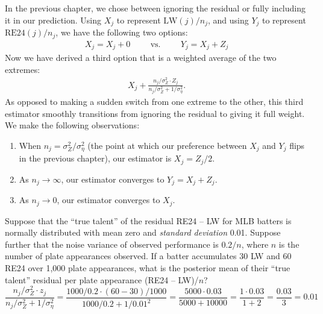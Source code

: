\documentclass{article}
\begin{document}
      In the previous chapter, we chose between ignoring the residual or fully including it in our prediction. Using $X_j$ to represent $\mbox{LW}(j) / n_j$, and using $Y_j$ to represent $\mbox{RE24}(j) / n_j$, we have the following two options:
      \begin{align*}
        X_j = X_j + 0 \hspace{1cm} \mbox{vs.} \hspace{1cm} Y_j = X_j + Z_j
      \end{align*}
      Now we have derived a third option that is a weighted average of the two extremes:
      \begin{align*}
        X_j + \frac{n_j / \sigma^2_Z \cdot Z_j}{n_j / \sigma^2_Z + 1 / \sigma^2_\eta}.
      \end{align*}
      As opposed to making a sudden switch from one extreme to the other, this third estimator smoothly transitions from ignoring the residual to giving it full weight. We make the following observations:
      \begin{enumerate}
        \item When $n_j = \sigma^2_Z / \sigma^2_\eta$ (the point at which our preference between $X_j$ and $Y_j$ flips in the previous chapter), our estimator is $X_j = Z_j / 2$.
        \item As $n_j \rightarrow \infty$, our estimator converges to $Y_j = X_j + Z_j$.
        \item As $n_j \rightarrow 0$, our estimator converges to $X_j$.
      \end{enumerate}

      \begin{framed}
         Suppose that the ``true talent'' of the residual RE24 -- LW for MLB batters is normally distributed with mean zero and {\it standard deviation} 0.01. Suppose further that the noise variance of observed performance is $0.2/n$, where $n$ is the number of plate appearances observed. If a batter accumulates 30 LW and 60 RE24 over 1,000 plate appearances, what is the posterior mean of their ``true talent'' residual per plate appearance (RE24 -- LW)/$n$?
        $$
          \frac{n_j / \sigma^2_Z \cdot z_j}{n_j / \sigma^2_Z + 1 / \sigma^2_\eta} =
            \frac{1000 / 0.2 \cdot (60 - 30) / 1000}{1000 / 0.2 + 1 / 0.01^2} =
            \frac{5000 \cdot 0.03}{5000 + 10000} =
            \frac{1 \cdot 0.03}{1 + 2} =
            \frac{0.03}{3} =
            0.01
        $$
      \end{framed}
\end{document}
